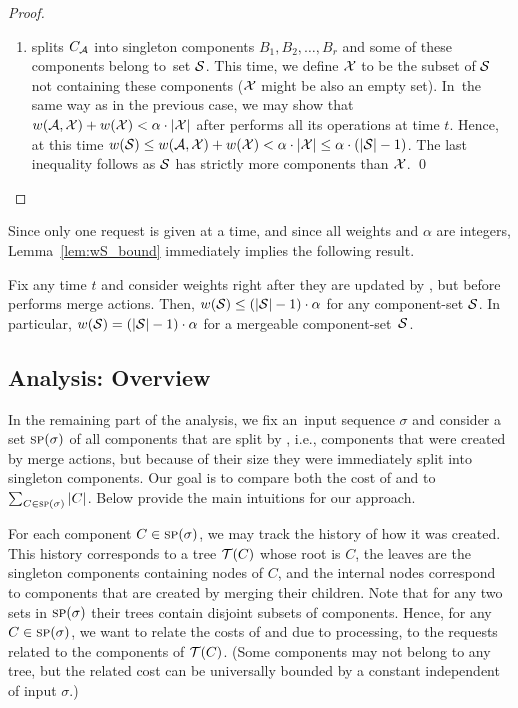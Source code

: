 \begin{proof}
\begin{enumerate}
\item \CREP splits $C_{\mathcal{A}}$ into singleton components $B_1, B_2, \ldots, B_r$ 
and some of these components belong to~set $\mathcal{S}$. This time, we define $\mathcal{X}$ to be
the subset of $\mathcal{S}$ not containing these components ($\mathcal{X}$ might be also an empty set). In~the
same way as in the previous case, we may show that $w(\mathcal{A},\mathcal{X}) + w(\mathcal{X}) < \alpha
\cdot |\mathcal{X}|$ after \CREP performs all its operations at time $t$. Hence, at this
time $w(\mathcal{S}) \leq w(\mathcal{A},\mathcal{X}) + w(\mathcal{X}) < \alpha \cdot |\mathcal{X}| \leq \alpha \cdot (|\mathcal{S}|-1)$.
The last inequality follows as $\mathcal{S}$ has strictly more components than $\mathcal{X}$.
\qed
\end{enumerate}
\end{proof}

Since only one request is given at a time, and since all weights and $\alpha$
are integers, Lemma~\ref{lem:wS_bound} immediately implies the following
result.

\begin{corollary}
\label{cor:mergeable_sets} Fix any time $t$ and consider weights right after
they are updated by \CREP, but before \CREP performs merge actions. Then,
$w(\mathcal{S}) \leq (|\mathcal{S}|-1) \cdot \alpha$ for any component-set $\mathcal{S}$. In particular,
$w(\mathcal{S}) = (|\mathcal{S}|-1) \cdot \alpha$ for a mergeable component-set~$\mathcal{S}$.
\end{corollary}


\subsection{Analysis: Overview}

In the remaining part of the analysis, we fix an~input sequence $\sigma$ and
consider a set $\textsc{sp}(\sigma)$ of all components that are split by \CREP, i.e.,
components that were created by merge actions, but because of their size they
were immediately split into singleton components. Our goal is to compare both
the cost of \OPT and \CREP to $\sum_{C \in \textsc{sp}(\sigma)} |C|$. 
Below provide the main intuitions for our approach.

For each component $C \in \textsc{sp}(\sigma)$, we may track the history of how it was
created. This history corresponds to a tree $\mathcal{T}(C)$ whose root is $C$, the leaves are the singleton components containing nodes of $C$, and the internal nodes correspond
to components that are created by merging their children. Note that for any
two sets in $\textsc{sp}(\sigma)$ their trees contain disjoint subsets of components.
Hence, for any $C \in \textsc{sp}(\sigma)$, we want to relate the costs of \OPT and
\CREP due to processing, 
to the requests related to the components of $\mathcal{T}(C)$. (Some
components may not belong to any tree, but the related cost can be universally
bounded by a constant independent of input $\sigma$.)

